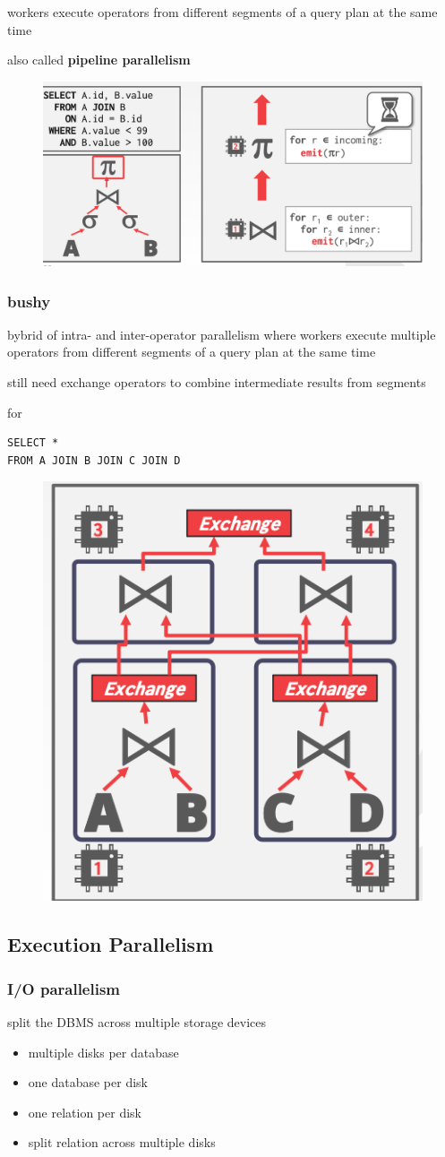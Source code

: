 \documentclass[11pt]{article}
\begin{document}
workers execute operators from different segments of a query plan at the same time

also called \textbf{pipeline parallelism}

\begin{figure}[htbp]
\centering
\includegraphics[width=.6\textwidth]{../images/15445/34.png}
\label{}
\end{figure}
\subsubsection{bushy}
\label{sec:org4c4d253}
bybrid of intra- and inter-operator parallelism where workers execute multiple operators from
different segments of a query plan at the same time

still need exchange operators to combine intermediate results from segments

for
\begin{verbatim}
SELECT *
FROM A JOIN B JOIN C JOIN D
\end{verbatim}

\begin{figure}[htbp]
\centering
\includegraphics[width=.4\textwidth]{../images/15445/35.png}
\label{}
\end{figure}
\subsection{Execution Parallelism}
\label{sec:org1ba39e6}
\subsubsection{I/O parallelism}
\label{sec:org01b8b1e}
split the DBMS across multiple storage devices
\begin{itemize}
\item multiple disks per database
\item one database per disk
\item one relation per disk
\item split relation across multiple disks
\end{itemize}
\end{document}
